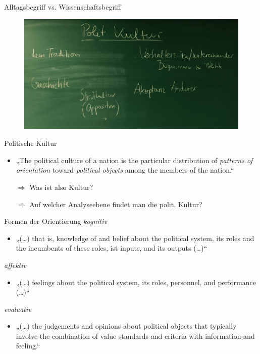\documentclass[11pt]{beamer}
\begin{document}
\begin{frame}{Alltagsbegriff vs. Wissenschaftsbegriff}
	\begin{figure}[ht]
		\includegraphics[width=\textwidth]{pics/s3-1.png}
		\caption{}
	\end{figure}

\end{frame}

\begin{frame}[t]{Politische Kultur}
	 \pause
	\begin{itemize}
		\item „The political culture of a nation is the particular distribution of \textit{patterns of orientation} toward \textit{political objects} among the members of the nation.“ \parencite[14]{Almond1963}	\pause
		\item[$\Rightarrow$] Was ist also Kultur? \pause
		\item[$\Rightarrow$] Auf welcher Analyseebene findet man die polit. Kultur?
	\end{itemize}
\end{frame}

\begin{frame}[t]{Formen der Orientierung}
	\textit{kognitiv} \pause
	\begin{itemize}
		\item \small „(…) that is, knowledge of and belief about the political system, its roles and the incumbents of these roles, ist inputs, and its outputs (…)“ \parencite[15]{Almond1963} \pause
	\end{itemize}
	
	\textit{affektiv} \pause
	\begin{itemize}
		\item\small  „(…) feelings about the political system, its roles, personnel, and performance (…)“ \parencite[15]{Almond1963} \pause
	\end{itemize}
	
	\textit{evaluativ} \pause
	\begin{itemize}
		\item \small „(…) the judgements and opinions about political objects that typically involve the combination of value standards and criteria with information and feeling.“ \parencite[15]{Almond1963} \pause
	\end{itemize}
\end{frame}
\end{document}
